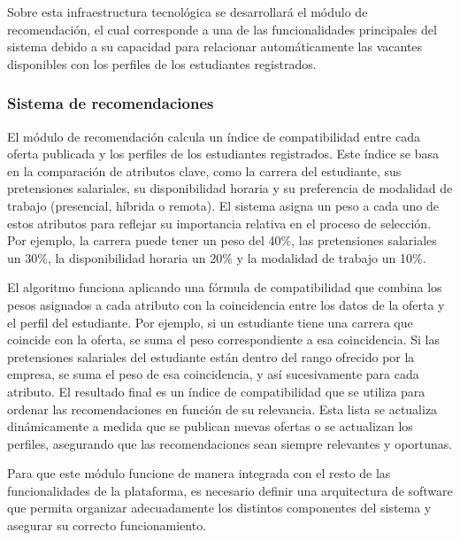 \documentclass[11pt,a4paper]{Plantilla}
\begin{document}
\vspace{5pt}

Sobre esta infraestructura tecnológica se desarrollará el módulo de recomendación, el cual corresponde a una de las funcionalidades principales del sistema debido a su capacidad para relacionar automáticamente las vacantes disponibles con los perfiles de los estudiantes registrados.

\subsubsection*{Sistema de recomendaciones}
El módulo de recomendación calcula un índice de compatibilidad entre cada oferta publicada y los perfiles de los estudiantes registrados. Este índice se basa en la comparación de atributos clave, como la carrera del estudiante, sus pretensiones salariales, su disponibilidad horaria y su preferencia de modalidad de trabajo (presencial, híbrida o remota). El sistema asigna un peso a cada uno de estos atributos para reflejar su importancia relativa en el proceso de selección. Por ejemplo, la carrera puede tener un peso del 40\%, las pretensiones salariales un 30\%, la disponibilidad horaria un 20\% y la modalidad de trabajo un 10\%.

\vspace{5pt}

El algoritmo funciona aplicando una fórmula de compatibilidad que combina los pesos asignados a cada atributo con la coincidencia entre los datos de la oferta y el perfil del estudiante. Por ejemplo, si un estudiante tiene una carrera que coincide con la oferta, se suma el peso correspondiente a esa coincidencia. Si las pretensiones salariales del estudiante están dentro del rango ofrecido por la empresa, se suma el peso de esa coincidencia, y así sucesivamente para cada atributo. El resultado final es un índice de compatibilidad que se utiliza para ordenar las recomendaciones en función de su relevancia. Esta lista se actualiza dinámicamente a medida que se publican nuevas ofertas o se actualizan los perfiles, asegurando que las recomendaciones sean siempre relevantes y oportunas.

\vspace{5pt}

Para que este módulo funcione de manera integrada con el resto de las funcionalidades de la plataforma, es necesario definir una arquitectura de software que permita organizar adecuadamente los distintos componentes del sistema y asegurar su correcto funcionamiento.
\end{document}

